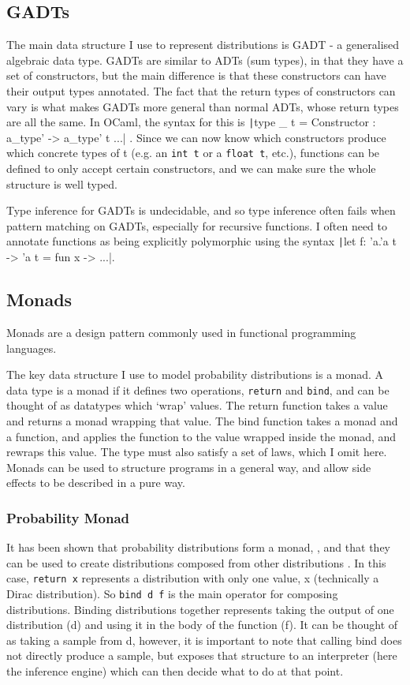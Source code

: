 \subsection{GADTs}
The main data structure I use to represent distributions is GADT - a generalised algebraic data type. GADTs are similar to ADTs (sum types), in that they have a set of constructors, but the main difference is that these constructors can have their output types annotated. The fact that the return types of constructors can vary is what makes GADTs more general than normal ADTs, whose return types are all the same. In OCaml, the syntax for this is \texttt|type _ t = Constructor : a_type' -> a_type' t ...| . Since we can now know which constructors produce which concrete types of t (e.g. an \texttt{int t} or a \texttt{float t}, etc.), functions can be defined to only accept certain constructors, and we can make sure the whole structure is well typed.

Type inference for GADTs is undecidable, and so type inference often fails when pattern matching on GADTs, especially for recursive functions. I often need to annotate functions as being explicitly polymorphic using the syntax \texttt|let f: 'a.'a t -> 'a t = fun x -> ...|.

\subsection{Monads}
Monads are a design pattern commonly used in functional programming languages.
	
The key data structure I use to model probability distributions is a monad. A data type is a monad if it defines two operations, \texttt{return} and \texttt{bind}, and can be thought of as datatypes which `wrap' values. The return function takes a value and returns a monad wrapping that value. The bind function takes a monad and a function, and applies the function to the value wrapped inside the monad, and rewraps this value. The type must also satisfy a set of laws, which I omit here\cite{wadler1990comprehending}. Monads can be used to structure programs in a general way, and allow side effects to be described in a pure way.
	
\subsubsection{Probability Monad}
It has been shown that probability distributions form a monad, \cite{giry1982categorical} \cite{jones1989probabilistic}, and that they can be used to create distributions composed from other distributions \cite{ramsey2002stochastic}. In this case, \texttt{return x} represents a distribution with only one value, x (technically a Dirac distribution). So \texttt{bind d f} is the main operator for composing distributions. Binding distributions together represents taking the output of one distribution (d) and using it in the body of the function (f). It can be thought of as taking a sample from d, however, it is important to note that calling bind does not directly produce a sample, but exposes that structure to an interpreter (here the inference engine) which can then decide what to do at that point.

